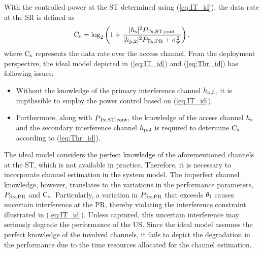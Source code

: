 With the controlled power at the ST determined using (\ref{eq:IT_id}), the data rate at the SR is defined as
\begin{equation}
\text{C}_{\text{s}} = \log_2 \left(1 + \frac{|h_{\text{s}}|^2 P_{\text{Tx,ST,cont}}}{ |h_{\text{p,2}}|^2 P_{\text{Tx,PR}} + \sigma^2_{\text{w}}} \right). 
\label{eq:Thr_id}
\end{equation}
where $\text{C}_{\text{s}}$ represents the data rate over the access channel. %
From the deployment perspective, the ideal model depicted in (\ref{eq:IT_id}) and (\ref{eq:Thr_id}) has following issues:
\begin{itemize}
\item Without the knowledge of the primary interference channel $h_{\text{p,3}}$, it is impthssible to employ the power control based on (\ref{eq:IT_id}). 
\item Furthermore, along with $P_{\text{Tx,ST,cont}}$, the knowledge of the access channel $h_{\text{s}}$ and the secondary interference channel $h_{\text{p,2}}$ is required to determine $\text{C}_{\text{s}}$ according to (\ref{eq:Thr_id}).
\end{itemize}
The ideal model considers the perfect knowledge of the aforementioned channels at the ST, which is not available in practice. Therefore, it is necessary to incorporate channel estimation in the system model. The imperfect channel knowledge, however, translates to the variations in the performance parameters, $P_{\text{Rx,PR}}$ and $\text{C}_{\text{s}}$. Particularly, a variation in $P_{\text{Rx,PR}}$ that exceeds $\theta_{\text{I}}$ causes uncertain interference at the PR, thereby violating the interference constraint illustrated in (\ref{eq:IT_id}). Unless captured, this uncertain interference may seriously degrade the performance of the US. Since the ideal model assumes the perfect knowledge of the involved channels, it fails to depict the degradation in the performance due to the time resources allocated for the channel estimation. %

